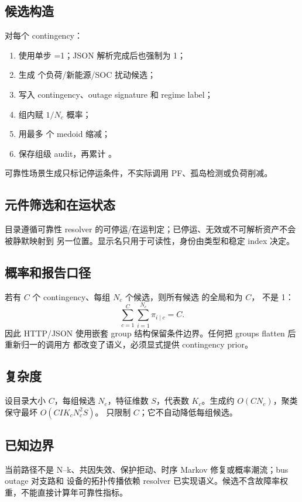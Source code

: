 \subsection{候选构造}
对每个 contingency：
\begin{enumerate}
  \item 使用单步 =1；JSON 解析完成后也强制为 1；
  \item 生成  个负荷/新能源/SOC 扰动候选；
  \item 写入 contingency、outage signature 和 regime label；
  \item 组内赋 $1/N_c$ 概率；
  \item 用最多  个 medoid 缩减；
  \item 保存组级 audit，再累计 。
\end{enumerate}
可靠性场景生成只标记停运条件，不实际调用 PF、孤岛检测或负荷削减。

\subsection{元件筛选和在运状态}
目录遵循可靠性 resolver 的可停运/在运判定；已停运、无效或不可解析资产不会被静默映射到
另一位置。显示名只用于可读性，身份由类型和稳定 index 决定。

\subsection{概率和报告口径}
若有 $C$ 个 contingency、每组 $N_c$ 个候选，则所有候选  的全局和为 $C$，
不是 1：
\begin{equation}
 \sum_{c=1}^C\sum_{i=1}^{N_c}\pi_{i\mid c}=C.
\end{equation}
因此 HTTP/JSON 使用嵌套 group 结构保留条件边界。任何把 groups flatten 后重新归一的调用方
都改变了语义，必须显式提供 contingency prior。

\subsection{复杂度}
设目录大小 $C$，每组候选 $N_c$，特征维数 $S$，代表数 $K_c$。生成约 $O(CN_c)$，聚类
保守最坏 $O(CIK_cN_c^2S)$。 只限制 $C$；它不自动降低每组候选。

\subsection{已知边界}
\begin{gapnote}
当前路径不是 N--k、共因失效、保护拒动、时序 Markov 修复或概率潮流；bus outage 对支路和
设备的拓扑传播依赖 resolver 已实现语义。候选不含故障率权重，不能直接计算年可靠性指标。
\end{gapnote}

